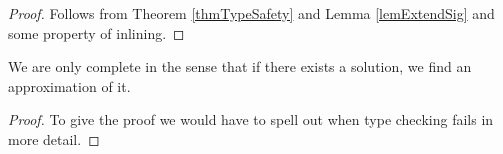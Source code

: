 \begin{proof}
    Follows from Theorem \ref{thmTypeSafety} and Lemma \ref{lemExtendSig} and
    some property of inlining.
\end{proof}

\begin{theorem}[Completeness]
    We are only complete in the sense that if there exists a solution, we find
    an approximation of it.
\end{theorem}
\begin{proof}
    To give the proof we would have to spell out when type checking fails in
    more detail.
\end{proof}

